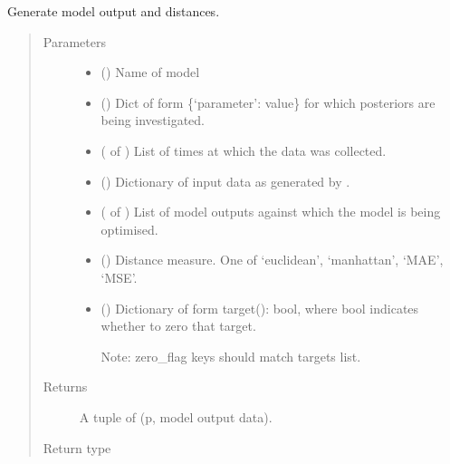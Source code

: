 \documentclass[letterpaper,10pt,english]{sphinxmanual}
\begin{document}
\begin{fulllineitems}
\label{\detokenize{misc:bayescmd.results_handling.get_output}}
Generate model output and distances.
\begin{quote}\begin{description}
\item[{Parameters}] \leavevmode\begin{itemize}
\item {} 
 () \textendash{} Name of model

\item {} 
 () \textendash{} Dict of form \{‘parameter’: value\} for which posteriors are being
investigated.

\item {} 
 ( of ) \textendash{} List of times at which the data was collected.

\item {} 
 () \textendash{} Dictionary of input data as generated by .

\item {} 
 ( of ) \textendash{} List of model outputs against which the model is being optimised.

\item {} 
 () \textendash{} Distance measure. One of ‘euclidean’, ‘manhattan’, ‘MAE’, ‘MSE’.

\item {} 
 () \textendash{} 
Dictionary of form target(): bool, where bool indicates
whether to zero that target.

Note: zero\_flag keys should match targets list.


\end{itemize}

\item[{Returns}] \leavevmode
A tuple of (p, model output data).

\item[{Return type}] \leavevmode
{}

\end{description}\end{quote}

\end{fulllineitems}
\end{document}
